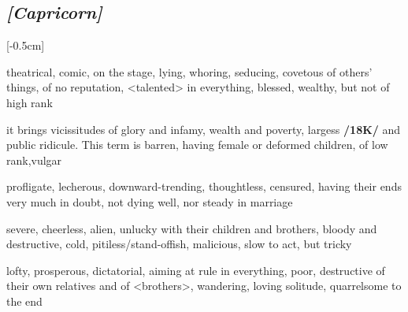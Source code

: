 \subsection{\textit{[Capricorn]}}
\marginnote{\Capricorn}[-0.5cm]
\vspace{-1mm}
\begin{description}[labelindent=0em , labelwidth=1em, labelsep=1em, leftmargin =!]
\item[\Mercury]
	[0-6] theatrical, comic, on the stage, lying, whoring,
seducing, covetous of others’ things, of no reputation, <talented> in everything, blessed, wealthy, but not of high rank
\item[\Jupiter]
	[7-13] it brings vicissitudes of glory and infamy, wealth and poverty,
largess \textbf{/18K/} and public ridicule. This term is barren, having female or deformed children, of low rank,vulgar
\item[\Venus]
	[14-21] profligate, lecherous, downward-trending, thoughtless, censured, having their ends very much in doubt, not dying well, nor steady in marriage
\item[\Saturn]
	[22-25] severe, cheerless, alien, unlucky with their children and brothers, bloody and destructive, cold, pitiless/stand-offish, malicious, slow to act, but tricky	
\item[\Mars]
	[26-29] lofty, prosperous, dictatorial, aiming at rule in everything, poor, destructive of their own relatives and of
<brothers>, wandering, loving solitude, quarrelsome to the end
\end{description}

